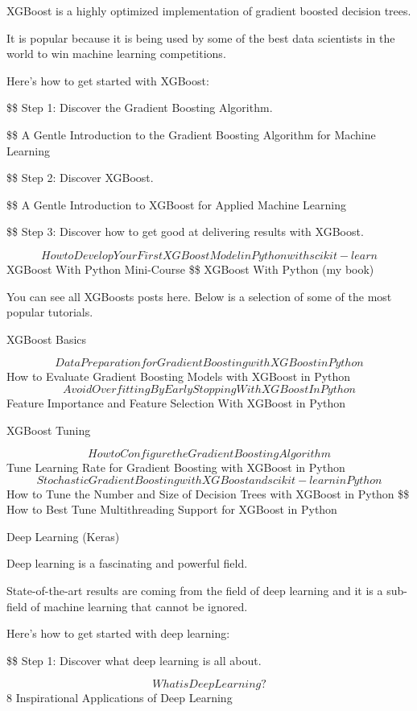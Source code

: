 \documentclass[11pt]{article}
\begin{document}
XGBoost is a highly optimized implementation of gradient boosted decision trees.

It is popular because it is being used by some of the best data scientists in the world to win machine learning competitions.

Here’s how to get started with XGBoost:

\$\$ Step 1: Discover the Gradient Boosting Algorithm. 

\$\$ A Gentle Introduction to the Gradient Boosting Algorithm for Machine Learning

\$\$ Step 2: Discover XGBoost. 

\$\$ A Gentle Introduction to XGBoost for Applied Machine Learning

\$\$ Step 3: Discover how to get good at delivering results with XGBoost. 

$$ How to Develop Your First XGBoost Model in Python with scikit-learn
 $$ XGBoost With Python Mini-Course
\$\$ XGBoost With Python (my book)

You can see all XGBoosts posts here. Below is a selection of some of the most popular tutorials.

XGBoost Basics

$$ Data Preparation for Gradient Boosting with XGBoost in Python
$$ How to Evaluate Gradient Boosting Models with XGBoost in Python
$$ Avoid Overfitting By Early Stopping With XGBoost In Python
$$ Feature Importance and Feature Selection With XGBoost in Python

XGBoost Tuning

$$ How to Configure the Gradient Boosting Algorithm
$$ Tune Learning Rate for Gradient Boosting with XGBoost in Python
$$ Stochastic Gradient Boosting with XGBoost and scikit-learn in Python
$$ How to Tune the Number and Size of Decision Trees with XGBoost in Python
\$\$ How to Best Tune Multithreading Support for XGBoost in Python

Deep Learning (Keras)

Deep learning is a fascinating and powerful field.

State-of-the-art results are coming from the field of deep learning and it is a sub-field of machine learning that cannot be ignored.

Here’s how to get started with deep learning:

\$\$ Step 1: Discover what deep learning is all about. 

$$ What is Deep Learning?
 $$ 8 Inspirational Applications of Deep Learning
\end{document}
